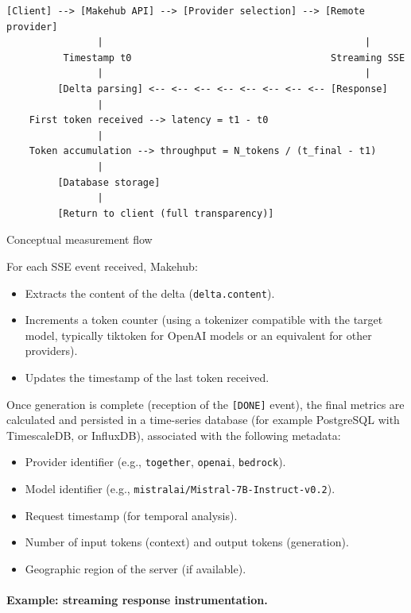 \documentclass[english]{article}
\begin{document}
\begin{listing}[H]
\begin{verbatim}
[Client] --> [Makehub API] --> [Provider selection] --> [Remote provider]
                |                                              |
          Timestamp t0                                   Streaming SSE
                |                                              |
         [Delta parsing] <-- <-- <-- <-- <-- <-- <-- <-- [Response]
                |
    First token received --> latency = t1 - t0
                |
    Token accumulation --> throughput = N_tokens / (t_final - t1)
                |
         [Database storage]
                |
         [Return to client (full transparency)]
\end{verbatim}
\caption{Conceptual measurement flow}
\end{listing}

For each SSE event received, Makehub:
\begin{itemize}
    \item Extracts the content of the delta (\texttt{delta.content}).
    \item Increments a token counter (using a tokenizer compatible with the target model, typically tiktoken for OpenAI models or an equivalent for other providers).
    \item Updates the timestamp of the last token received.
\end{itemize}

Once generation is complete (reception of the \texttt{[DONE]} event), the final metrics are calculated and persisted in a time-series database (for example PostgreSQL with TimescaleDB, or InfluxDB), associated with the following metadata:
\begin{itemize}
    \item Provider identifier (e.g., \texttt{together}, \texttt{openai}, \texttt{bedrock}).
    \item Model identifier (e.g., \texttt{mistralai/Mistral-7B-Instruct-v0.2}).
    \item Request timestamp (for temporal analysis).
    \item Number of input tokens (context) and output tokens (generation).
    \item Geographic region of the server (if available).
\end{itemize}

\paragraph{Example: streaming response instrumentation.}
\end{document}
